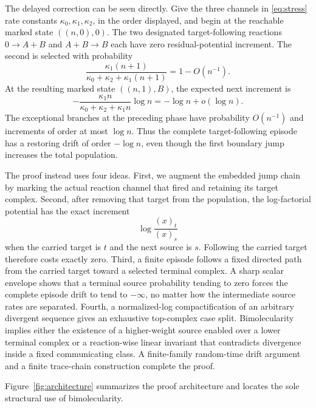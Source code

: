 The delayed correction can be seen directly.  Give the three channels in
\eqref{eq:stress} rate constants \(\kappa_0,\kappa_1,\kappa_2\), in the order
displayed, and begin at the reachable marked state \(((n,0),0)\).  The two
designated target-following reactions \(0\to A+B\) and \(A+B\to B\) each
have zero residual-potential increment.  The second is selected with
probability
\[
 \frac{\kappa_1(n+1)}{\kappa_0+\kappa_2+\kappa_1(n+1)}=1-O(n^{-1}).
\]
At the resulting marked state \(((n,1),B)\), the expected next increment is
\begin{equation}\label{eq:stress-drift}
 -\frac{\kappa_1n}{\kappa_0+\kappa_2+\kappa_1n}\log n
 =-\log n+o(\log n).
\end{equation}
The exceptional branches at the preceding phase have probability
\(O(n^{-1})\) and increments of order at most \(\log n\).  Thus the complete
target-following episode has a restoring drift of order \(-\log n\), even
though the first boundary jump increases the total population.

The proof instead uses four ideas.  First, we augment the embedded jump chain
by marking the actual reaction channel that fired and retaining its target
complex.  Second, after removing that target from the population, the
log-factorial potential has the exact increment
\[
  \log\frac{(x)_t}{(x)_s}
\]
when the carried target is \(t\) and the next source is \(s\).  Following the
carried target therefore costs exactly zero.  Third, a finite episode follows
a fixed directed path from the carried target toward a selected terminal
complex.  A sharp scalar envelope shows that a terminal source probability
tending to zero forces the complete episode drift to tend to \(-\infty\), no
matter how the intermediate source rates are separated.  Fourth, a
normalized-log compactification of an arbitrary divergent sequence gives an
exhaustive top-complex case split.  Bimolecularity implies either the
existence of a higher-weight source enabled over a lower terminal complex or
a reaction-wise linear invariant that contradicts divergence inside a fixed
communicating class.  A finite-family random-time drift argument and a finite
trace-chain construction complete the proof.

Figure~\ref{fig:architecture} summarizes the proof architecture and locates
the sole structural use of bimolecularity.


